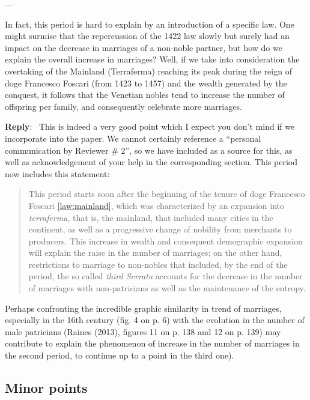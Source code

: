\documentclass[11pt]{article}
\newcounter{reviewer}
\newcounter{point}[reviewer]
\renewcommand{\thepoint}{P\,\thereviewer.\arabic{point}}
\newenvironment{point}
   {\refstepcounter{point} \bigskip \noindent {\textbf{Reviewer~Point~\thepoint} } ---\ }
   {\par }
\newenvironment{reply}
   {\medskip \noindent \begin{sf}\textbf{Reply}:\  }
   {\medskip \end{sf}}
\begin{document}
\begin{point}

  In fact, this period is hard to explain by an introduction of a specific
  law. One might surmise that the repercussion of the 1422 law slowly but surely
  had an impact on the decrease in marriages of a non-noble partner, but how do
  we explain the overall increase in marriages? Well, if we take into
  consideration the overtaking of the Mainland (Terraferma) reaching its peak
  during the reign of doge Francesco Foscari (from 1423 to 1457) and the wealth
  generated by the conquest, it follows that the Venetian nobles tend to
  increase the number of offspring per family, and consequently celebrate more
  marriages.
\end{point}

\begin{reply}
This is indeed a very good point which I expect you don't mind if we incorporate
into the paper. We cannot certainly reference a ``personal communication by
Reviewer \# 2'', so we have included \cite{law:mainland} as a source for this,
as well as acknowledgement of your help in the corresponding section. This
period now includes this statement:\begin{quote}
  This period starts soon after the beginning of the tenure of doge Francesco
  Foscari \ref{law:mainland}, which was characterized by an expansion into {\em
    terraferma}, that is, the mainland, that included many cities in the
  continent, as well as a progressive change of nobility from merchants to
  producers. This increase in wealth and consequent demographic expansion will
  explain the raise in the number of marriages; on the other hand, restrictions
  to marriage to non-nobles that included, by the end of the period, the so
  called {\em third Serrata} \cite{chojnacki00} accounts for the decrease in the
  number of marriages with non-patricians as well as the maintenance of the
  entropy.
\end{quote}
\end{reply}

  Perhaps confronting the incredible graphic similarity in trend of marriages, especially in the 16th century (fig. 4 on p. 6) with the evolution in the number of male patricians (Raines (2013), figures 11 on p. 138 and 12 on p. 139) may contribute to explain the phenomenon of increase in the number of marriages in the second period, to continue up to a point in the third one).
  
\subsection{Minor points}
\end{document}
